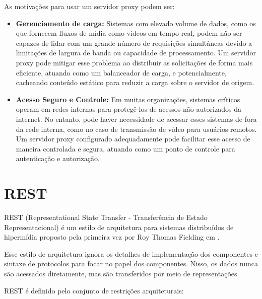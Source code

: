 \documentclass[12pt, %
openright, 
oneside, %
a4paper,    %
brazil]{facom-ufu-abntex2}
\begin{document}
As motivações para usar um servidor proxy podem ser:

\begin{itemize}
	\item \textbf{Gerenciamento de carga:} Sistemas com elevado volume de
	      dados, como os que fornecem fluxos de mídia como vídeos em tempo
	      real, podem não ser capazes de lidar com um grande número de requisições
	      simultâneas devido a limitações de largura de banda ou capacidade de
	      processamento. Um servidor proxy pode mitigar esse problema ao distribuir as
	      solicitações de forma mais eficiente, atuando como um balanceador de carga, e
	      potencialmente, cacheando conteúdo estático para reduzir a carga sobre o
	      servidor de origem.
	\item \textbf{Acesso Seguro e Controle:} Em muitas organizações,
	      sistemas críticos operam em redes internas para protegê-los de
	      acessos não autorizados da internet. No entanto, pode haver necessidade de
	      acessar esses sistemas de fora da rede interna, como no caso de transmissão de
	      vídeo para usuários remotos. Um servidor proxy configurado adequadamente pode
	      facilitar esse acesso de maneira controlada e segura, atuando como um ponto de
	      controle para autenticação e autorização.

\end{itemize}

\section{REST}

REST (Representational State Transfer - Transferência de Estado
Representacional) é um estilo de arquitetura para sistemas distribuídos de
hipermídia proposto pela primeira vez por Roy Thomas Fielding em
.

Esse estilo de arquitetura ignora os detalhes de implementação dos componentes
e sintaxe de protocolos para focar no papel dos componentes. Nisso, os dados
nunca são acessados diretamente, mas são transferidos por meio de
representações.

REST é definido pelo conjunto de restrições arquiteturais:
\end{document}
